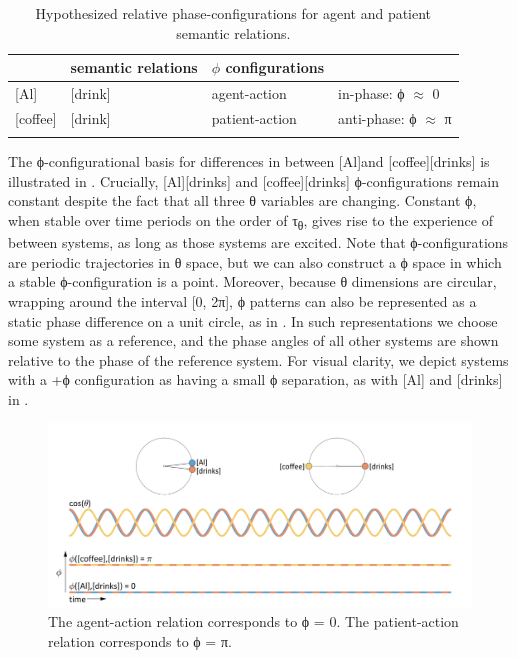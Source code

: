   \begin{table}
\begin{tabularx}{\textwidth}{XXll}
  \lsptoprule
  \multicolumn{2}{c}{\textbf{conceptual systems}} & 
  \textbf{semantic relations} & 
  \textbf{$\phi$ configurations}\\
  \midrule{}
  [Al] & [drink] & agent-action & in-phase: ϕ ${\approx}$ 0\\{}
  [coffee] & [drink] & patient-action & anti-phase: ϕ ${\approx}$ π\\
  \lspbottomrule
  \end{tabularx}
\caption{Hypothesized relative phase-configurations for agent and patient semantic relations.}
\label{tab:1:1}
\end{table}

  The ϕ-configurational basis for differences in  between [Al]\linebreak\relax[drinks] and [coffee][drinks] is illustrated in {}. Crucially, [Al][drinks] and [coffee][drinks] ϕ-configurations remain constant despite the fact that all three θ variables are changing. Constant ϕ, when stable over time periods on the order of τ\textsubscript{θ}, gives rise to the experience of  between systems, as long as those systems are excited. Note that ϕ-configurations are periodic trajectories in θ space, but we can also construct a ϕ space in which a stable ϕ-configuration is a point. Moreover, because θ dimensions are circular, wrapping around the interval [0, 2π], ϕ patterns can also be represented as a static phase difference on a unit circle, as in {}. In such representations we choose some system as a reference, and the phase angles of all other systems are shown relative to the phase of the reference system. For visual clarity, we depict systems with a +ϕ configuration as having a small ϕ separation, as with [Al] and [drinks] in {}.

  
\begin{figure}
\includegraphics[width=\textwidth]{figures/Tilsen-img15.png}
\caption{The agent-action relation corresponds to ϕ = 0. The patient-action relation corresponds to ϕ = π.}
\label{fig:2:8}
\end{figure}
 


